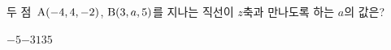 두 점~$\mathrm{A}(-4{,}\mkern3mu\mathopen{}4{,}\mkern3mu\mathopen{}-2)$, $\mathrm{B}(3{,}\mkern3mu\mathopen{}a{,}\mkern3mu\mathopen{}5)$를 지나는 직선이 $z$축과 만나도록 하는 $a$의 값은?
\begin{choices32}{$-5$}{$-3$}{$1$}{$3$}{$5$}\end{choices32}
